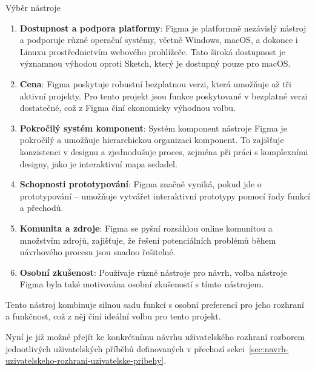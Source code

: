 \begin{subsection}{Výběr nástroje}
    \begin{enumerate}
        \item \textbf{Dostupnost a podpora platformy}: Figma je platformně nezávislý nástroj a podporuje různé operační systémy, včetně Windows, macOS, a dokonce i Linuxu prostřednictvím webového prohlížeče.
        Tato široká dostupnost je významnou výhodou oproti Sketch, který je dostupný pouze pro macOS\@.
        \item \textbf{Cena}: Figma poskytuje robustní bezplatnou verzi, která umožňuje až tři aktivní projekty.
        Pro tento projekt jsou funkce poskytované v bezplatné verzi dostatečné, což z Figma činí ekonomicky výhodnou volbu.
        \item \textbf{Pokročilý systém komponent}: Systém komponent nástroje Figma je pokročilý a umožňuje hierarchickou organizaci komponent.
        To zajišťuje konzistenci v designu a zjednodušuje proces, zejména při práci s komplexními designy, jako je interaktivní mapa sedadel.
        \item \textbf{Schopnosti prototypování}: Figma značně vyniká, pokud jde o prototypování – umožňuje vytvářet interaktivní prototypy pomocí řady funkcí a přechodů.
        \item \textbf{Komunita a zdroje}: Figma se pyšní rozsáhlou online komunitou a množstvím zdrojů, zajišťuje, že řešení potenciálních problémů během návrhového procesu jsou snadno řešitelné.
        \item \textbf{Osobní zkušenost}: Používaje různé nástroje pro návrh, volba nástroje Figma byla také motivována osobní zkušeností s tímto nástrojem.
    \end{enumerate}

    Tento nástroj kombinuje silnou sadu funkcí s osobní preferencí pro jeho rozhraní a funkčnost, což z něj činí ideální volbu pro tento projekt.

    Nyní je již možné přejít ke konkrétnímu návrhu uživatelského rozhraní rozborem jednotlivých uživatelských příběhů definovaných v přechozí sekci~\ref{sec:navrh-uzivatelskeho-rozhrani-uzivatelske-pribehy}.
\end{subsection}
